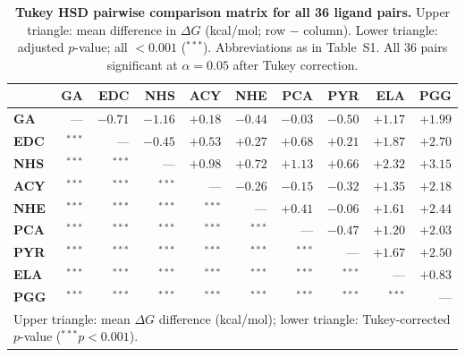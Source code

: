 \documentclass[11pt]{article}
\begin{document}
\begin{table}[H]
\small
\centering
\caption{\textbf{Tukey HSD pairwise comparison matrix for all 36 ligand pairs.}
  Upper triangle: mean difference in $\Delta G$ (kcal/mol; row $-$ column).
  Lower triangle: adjusted $p$-value; all $< 0.001$ ($^{***}$).
  Abbreviations as in Table~S1.
  All 36 pairs significant at $\alpha = 0.05$ after Tukey correction.}
\label{tab:si_tukey}
\begin{tabular}{lrrrrrrrrr}
\toprule
 & \textbf{GA} & \textbf{EDC} & \textbf{NHS} & \textbf{ACY} & \textbf{NHE}
   & \textbf{PCA} & \textbf{PYR} & \textbf{ELA} & \textbf{PGG} \\
\midrule
\textbf{GA}  & ---   & $-0.71$ & $-1.16$ & $+0.18$ & $-0.44$ & $-0.03$ & $-0.50$ & $+1.17$ & $+1.99$ \\
\textbf{EDC} & $^{***}$ & ---   & $-0.45$ & $+0.53$ & $+0.27$ & $+0.68$ & $+0.21$ & $+1.87$ & $+2.70$ \\
\textbf{NHS} & $^{***}$ & $^{***}$ & ---   & $+0.98$ & $+0.72$ & $+1.13$ & $+0.66$ & $+2.32$ & $+3.15$ \\
\textbf{ACY} & $^{***}$ & $^{***}$ & $^{***}$ & ---   & $-0.26$ & $-0.15$ & $-0.32$ & $+1.35$ & $+2.18$ \\
\textbf{NHE} & $^{***}$ & $^{***}$ & $^{***}$ & $^{***}$ & ---   & $+0.41$ & $-0.06$ & $+1.61$ & $+2.44$ \\
\textbf{PCA} & $^{***}$ & $^{***}$ & $^{***}$ & $^{***}$ & $^{***}$ & ---   & $-0.47$ & $+1.20$ & $+2.03$ \\
\textbf{PYR} & $^{***}$ & $^{***}$ & $^{***}$ & $^{***}$ & $^{***}$ & $^{***}$ & ---   & $+1.67$ & $+2.50$ \\
\textbf{ELA} & $^{***}$ & $^{***}$ & $^{***}$ & $^{***}$ & $^{***}$ & $^{***}$ & $^{***}$ & ---   & $+0.83$ \\
\textbf{PGG} & $^{***}$ & $^{***}$ & $^{***}$ & $^{***}$ & $^{***}$ & $^{***}$ & $^{***}$ & $^{***}$ & --- \\
\bottomrule
\multicolumn{10}{l}{\small Upper triangle: mean $\Delta G$ difference (kcal/mol); lower triangle: Tukey-corrected $p$-value ($^{***} p < 0.001$).}
\end{tabular}
\end{table}
\end{document}
